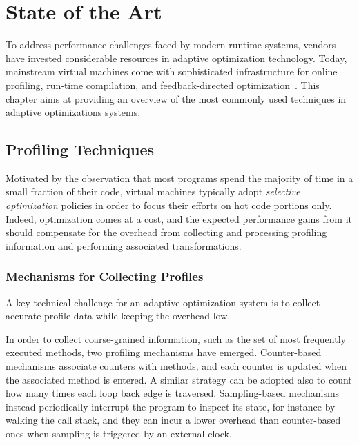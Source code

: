 \chapter{State of the Art}
\label{ch:literature}

To address performance challenges faced by modern runtime systems, vendors have invested considerable resources in adaptive optimization technology. Today, mainstream virtual machines come with sophisticated infrastructure for online profiling, run-time compilation, and feedback-directed optimization~\cite{Arnold05}. This chapter aims at providing an overview of the most commonly used techniques in adaptive optimizations systems.

\section{Profiling Techniques}
Motivated by the observation that most programs spend the majority of time in a small fraction of their code, virtual machines typically adopt {\em selective optimization} policies in order to focus their efforts on hot code portions only. Indeed, optimization comes at a cost, and the expected performance gains from it should compensate for the overhead from collecting and processing profiling information and performing associated transformations.

\subsection*{Mechanisms for Collecting Profiles}
A key technical challenge for an adaptive optimization system is to collect accurate profile data while keeping the overhead low.

In order to collect coarse-grained information, such as the set of most frequently executed methods, two profiling mechanisms have emerged. Counter-based mechanisms associate counters with methods, and each counter is updated when the associated method is entered. A similar strategy can be adopted also to count how many times each loop back edge is traversed. Sampling-based mechanisms instead periodically interrupt the program to inspect its state, for instance by walking the call stack, and they can incur a lower overhead than counter-based ones when sampling is triggered by an external clock.

